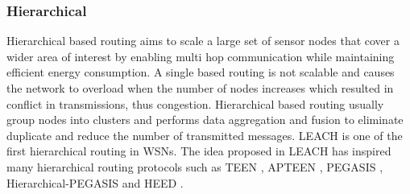 
\subsubsection{Hierarchical}
Hierarchical based routing aims to scale a large set of sensor nodes that cover a wider area of interest by enabling multi hop communication while maintaining efficient energy consumption. A single based routing is not scalable and causes the network to overload when the number of nodes increases which resulted in conflict in transmissions, thus congestion. Hierarchical based routing usually group nodes into clusters and performs data aggregation and fusion to eliminate duplicate and reduce the number of transmitted messages. LEACH \cite{lifetimedef2} is one of the first hierarchical routing in WSNs. The idea proposed in LEACH has inspired many hierarchical routing protocols such as TEEN \cite{teen}, APTEEN \cite{apteen}, PEGASIS \cite{pegasis}, Hierarchical-PEGASIS \cite{hpegasis} and HEED \cite{heed}. 



